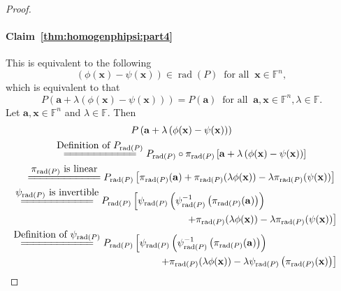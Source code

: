 \documentclass[10pt,a4paper]{amsart}
\def\F{{\mathbb F}}
\DeclareMathOperator{\rad}{rad}
\begin{document}
\begin{proof}
\paragraph{Claim~\ref{thm:homogenphipsi:part4}}%
This is equivalent to the following
\begin{equation*}\label{thm:homogenphipsi:eq14}
\left(\phi(\mathbf x) - \psi(\mathbf x)\right) \in \rad(P)\;\;\mbox{for all}\;\;\mathbf x \in \F^n,
\end{equation*}
which is equivalent to that
\begin{equation}\label{thm:homogenphipsi:eq15}
P(\mathbf a + \lambda \left(\phi(\mathbf x) - \psi(\mathbf x)\right)) = P(\mathbf a)\;\;\mbox{for all}\;\;\mathbf a, \mathbf x \in \F^n, \lambda \in \F.
\end{equation}
Let $\mathbf a, \mathbf x \in \F^n$ and $\lambda  \in \F.$ Then
{\setlength{\jot}{15pt}
\begin{multline*}\label{thm:homogenphipsi:eq16}
P\left(\mathbf a + \lambda\left(\phi(\mathbf x) - \psi(\mathbf x)\right)\right)\\
\overset{\scriptsize\mbox{Definition of $P_{\rad(P)}$}}{=\joinrel=\joinrel=\joinrel=\joinrel=\joinrel=\joinrel=\joinrel=\joinrel=\joinrel=\joinrel=\joinrel=}
P_{\rad(P)} \circ \pi_{\rad(P)}\left[\mathbf a + \lambda\left(\phi(\mathbf x) - \psi(\mathbf x)\right)\right]\\
\overset{\scriptsize\mbox{$\pi_{\rad(P)}$ is linear}}{=\joinrel=\joinrel=\joinrel=\joinrel=\joinrel=\joinrel=\joinrel=\joinrel=\joinrel=\joinrel=\joinrel=}
P_{\rad(P)} \left[\pi_{\rad(P)}(\mathbf a) + \pi_{\rad(P)}( \lambda \phi(\mathbf x)) - \lambda\pi_{\rad(P)}( \psi(\mathbf x))\right]\\
\overset{\scriptsize\mbox{$\psi_{\rad(P)}$ is invertible}}{=\joinrel=\joinrel=\joinrel=\joinrel=\joinrel=\joinrel=\joinrel=\joinrel=\joinrel=\joinrel=\joinrel=}
P_{\rad(P)} \left[\psi_{\rad(P)}\left(\psi_{\rad(P)}^{-1}\left(\pi_{\rad(P)}(\mathbf a)\right)\right)\right.\phantom{XXXXXXXXX}\\\phantom{XXXXXXXXXXXXXXXXXX}\left.
+ \pi_{\rad(P)}(\lambda  \phi(\mathbf x)) - \lambda \pi_{\rad(P)}( \psi(\mathbf x))\right]\\
\overset{\scriptsize\mbox{Definition of $\psi_{\rad(P)}$}}{=\joinrel=\joinrel=\joinrel=\joinrel=\joinrel=\joinrel=\joinrel=\joinrel=\joinrel=\joinrel=\joinrel=}
P_{\rad(P)} \left[\psi_{\rad(P)}\left(\psi_{\rad(P)}^{-1}\left(\pi_{\rad(P)}(\mathbf a)\right)\right)\right.\phantom{XXXXXXXXX}\\\phantom{XXXXXXXXXXXXXXX}\left. + \pi_{\rad(P)}( \lambda \phi(\mathbf x)) - \lambda \psi_{\rad(P)}\left(\pi_{\rad(P)}(\mathbf x)\right)\right]\\

\end{multline*}}
\end{proof}
\end{document}
